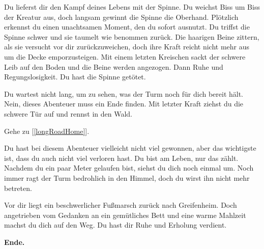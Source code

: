 Du lieferst dir den Kampf deines Lebens mit der Spinne. Du weichst Biss um Biss der Kreatur aus, doch langsam gewinnt die Spinne die Oberhand. Plötzlich erkennst du einen unachtsamen Moment, den du sofort ausnutzt. Du triffst die Spinne schwer und sie taumelt wie benommen zurück. Die haarigen Beine zittern, als sie versucht vor dir zurückzuweichen, doch ihre Kraft reicht nicht mehr aus um die Decke emporzusteigen. Mit einem letzten Kreischen sackt der schwere Leib auf den Boden und die Beine werden angezogen. Dann Ruhe und Regungslosigkeit. Du hast die Spinne getötet.

Du wartest nicht lang, um zu sehen, was der Turm noch für dich bereit hält. Nein, dieses Abenteuer muss ein Ende finden. Mit letzter Kraft ziehst du die schwere Tür auf und rennst in den Wald.

Gehe zu [\ref{longRoadHome}].


Du hast bei diesem Abenteuer vielleicht nicht viel gewonnen, aber das wichtigste ist, dass du auch nicht viel verloren hast. Du bist am Leben, nur das zählt. Nachdem du ein paar Meter gelaufen bist, siehst du dich noch einmal um. Noch immer ragt der Turm bedrohlich in den Himmel, doch du wirst ihn nicht mehr betreten.

Vor dir liegt ein beschwerlicher Fußmarsch zurück nach Greifenheim. Doch angetrieben vom Gedanken an ein gemütliches Bett und eine warme Mahlzeit machst du dich auf den Weg. Du hast dir Ruhe und Erholung verdient.

\textbf{Ende.}
